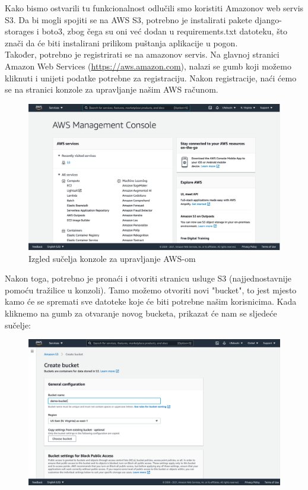 {			Kako bismo ostvarili tu funkcionalnost odlučili smo koristiti Amazonov web servis S3. Da bi mogli spojiti se na AWS S3, potrebno je instalirati pakete django-storages i boto3, zbog čega su oni već dodan u requirements.txt datoteku, što znači da će biti instalirani prilikom puštanja aplikacije u pogon.\\
			Također, potrebno je registrirati se na amazonov servis. Na glavnoj stranici Amazon Web Services (\url{https://aws.amazon.com}), nalazi se gumb koji možemo kliknuti i unijeti podatke potrebne za registraciju. Nakon registracije, naći ćemo se na stranici konzole za upravljanje našim AWS računom.\\
			\begin{figure}[H]
				\centering
				\includegraphics[width=1\linewidth]{slike/AWS1}
				\caption{Izgled sučelja konzole za upravljanje AWS-om}
				\label{fig:aws1}
			\end{figure}
			Nakon toga, potrebno je pronaći i otvoriti stranicu usluge S3 (najjednostavnije pomoću tražilice u konzoli). Tamo možemo otvoriti novi "bucket", to jest mjesto kamo će se spremati sve datoteke koje će biti potrebne našim korisnicima. Kada kliknemo na gumb za otvaranje novog bucketa, prikazat će nam se sljedeće sučelje:
			\begin{figure}[H]
				\centering
				\includegraphics[width=1\linewidth]{slike/AWS2}

\end{figure}}
